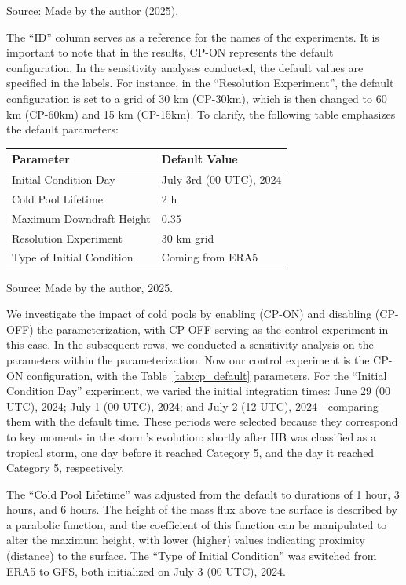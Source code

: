 \begin{center}
Source: Made by the author (2025).
\end{center}

The “ID” column serves as a reference for the names of the experiments. It is important to note that in the results, CP-ON represents the default configuration. In the sensitivity analyses conducted, the default values are specified in the labels. For instance, in the “Resolution Experiment”, the default configuration is set to a grid of 30 km (CP-30km), which is then changed to 60 km (CP-60km) and 15 km (CP-15km). To clarify, the following table emphasizes the default parameters:

\begin{center}
 \label{tab:cp_default}
\begin{tabular}{m{5.5cm} m{6cm}}
\textbf{Parameter} & \textbf{Default Value} \\
\hline
Initial Condition Day & July 3rd (00 UTC), 2024 \\
Cold Pool Lifetime & 2 h \\
Maximum Downdraft Height & 0.35 \\
Resolution Experiment & 30 km grid \\
Type of Initial Condition & Coming from ERA5 \\
\end{tabular}
\vspace{0.5em}

Source: Made by the author, 2025.
\end{center}


We investigate the impact of cold pools by enabling (CP-ON) and disabling (CP-OFF) the parameterization, with CP-OFF serving as the control experiment in this case. In the subsequent rows, we conducted a sensitivity analysis on the parameters within the parameterization. Now our control experiment is the CP-ON configuration, with the Table~\ref{tab:cp_default} parameters. For the “Initial Condition Day” experiment, we varied the initial integration times: June 29 (00 UTC), 2024; July 1 (00 UTC), 2024; and July 2 (12 UTC), 2024 - comparing them with the default time. These periods were selected because they correspond to key moments in the storm’s evolution: shortly after HB was classified as a tropical storm, one day before it reached Category 5, and the day it reached Category 5, respectively.

The “Cold Pool Lifetime” was adjusted from the default to durations of 1 hour, 3 hours, and 6 hours. The height of the mass flux above the surface is described by a parabolic function, and the coefficient of this function can be manipulated to alter the maximum height, with lower (higher) values indicating proximity (distance) to the surface. The “Type of Initial Condition” was switched from ERA5 to GFS, both initialized on July 3 (00 UTC), 2024.

